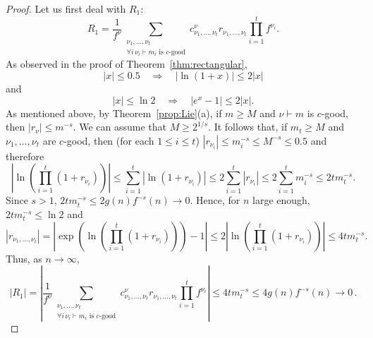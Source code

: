 \documentclass[12pt]%
{amsart}
\newcommand{\al}{{\alpha}}
\def\red#1{{\color{red}{#1}}}
\theoremstyle{plain}
\theoremstyle{definition}
\theoremstyle{remark}
\newcommand{\todo}[1]{\vspace{5 mm}\par \noindent
	\marginpar{\textsc{ToDo}} \framebox{\begin{minipage}[c]{0.95
				\textwidth}
			#1 \end{minipage}}\vspace{5 mm}\par}
\begin{document}
\begin{proof}
Let us first deal with $R_1$:
\[
    R_1
    = \frac{1}{f^\nu} \sum_{\substack{\nu_1,\ldots,\nu_t \\ \forall i\, \nu_i \vdash m_i \text{ is $c$-good}}} c^\nu_{\nu_1,\ldots,\nu_t} r_{\nu_1, \dots, \nu_t} \prod_{i=1}^t f^{\nu_i} .
\]
As observed in the proof of Theorem~\ref{thm:rectangular}, 
\[
    |x| \le 0.5 
    \quad \Longrightarrow \quad 
    |\ln(1+x)| \le 2|x|
\]
and %
\[
    |x| \le \ln 2 
    \quad \Longrightarrow \quad
    |e^x - 1| \le 2|x|.
\]
As mentioned above, by Theorem~\ref{prop:Lie}(a), 
if $m \ge M$ and $\nu \vdash m$ is $c$-good, then $|r_\nu| \le m^{-s}$.
We can assume that $M \ge 2^{1/s}$. It follows that, if $m_t \ge M$ and $\nu_1, \dots, \nu_t$ are $c$-good, then (for each $1 \le i \le t$) $|r_{\nu_i}| \le m_i^{-s} \le M^{-s} \le 0.5$ and therefore
\[
    \left| \ln \left( \prod_{i = 1}^t (1 + r_{\nu_i}) \right) \right|
    \le \sum_{i = 1}^t |\ln(1+r_{\nu_i})|
    \le 2 \sum_{i = 1}^t |r_{\nu_i}|
    \le 2 \sum_{i = 1}^t m_i^{-s}
    \le 2t m_t^{-s} .
\]
Since $s>1$, $2t m_t^{-s} \le  2g(n)f^{-s}(n) \to 0$. Hence, for $n$ large enough, $2t m_t^{-s} \le \ln 2$ and 
\[
    |r_{\nu_1, \dots, \nu_t}|
    = \left| \exp \left( \ln \left( \prod_{i = 1}^t (1+r_{\nu_i}) \right) \right) - 1 \right|
    \le 2 \left| \ln \left( \prod_{i = 1}^t (1+r_{\nu_i}) \right) \right|
    \le 4t m_t^{-s} .
\]
Thus, as $n \rightarrow \infty$,
\begin{equation}\label{eq:R1}   
    |R_1| 
    = \left| \frac{1}{f^\nu} \sum_{\substack{\nu_1,\ldots,\nu_t \\ \forall i\, \nu_i \vdash m_i \text{ is $c$-good}}} c^\nu_{\nu_1,\ldots,\nu_t} r_{\nu_1, \dots, \nu_t} \prod_{i=1}^t f^{\nu_i} \right|
    \le 4t m_t^{-s} 
    \le 4g(n)f^{-s}(n)
    \rightarrow 0 \,.
\end{equation}



\end{proof}
\end{document}
